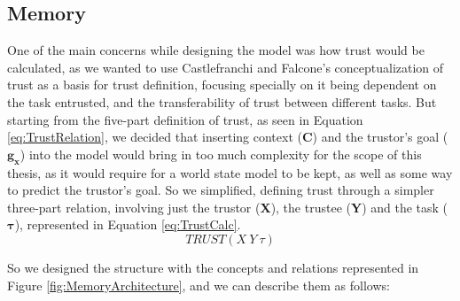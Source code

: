 \subsection{Memory}
One of the main concerns while designing the model was how trust would be calculated, as we wanted to use Castlefranchi and Falcone's conceptualization of trust \cite{Castelfranchi2010} as a basis for trust definition, focusing specially on it being dependent on the task entrusted, and the transferability of trust between different tasks. But starting from the five-part definition of trust, as seen in Equation \ref{eq:TrustRelation}, we decided that inserting context (\textbf{C}) and the trustor's goal ($\bm{g_x}$) into the model would bring in too much complexity for the scope of this thesis, as it would require for a world state model to be kept, as well as some way to predict the trustor's goal. So we simplified, defining trust through a simpler three-part relation, involving just the trustor (\textbf{X}), the trustee (\textbf{Y}) and the task ($\bm{\tau}$), represented in Equation \ref{eq:TrustCalc}.
\begin{equation}
TRUST(X\ Y\ \tau)
\label{eq:TrustCalc}
\end{equation}

So we designed the structure with the concepts and relations represented in Figure \ref{fig:MemoryArchitecture}, and we can describe them as follows:

